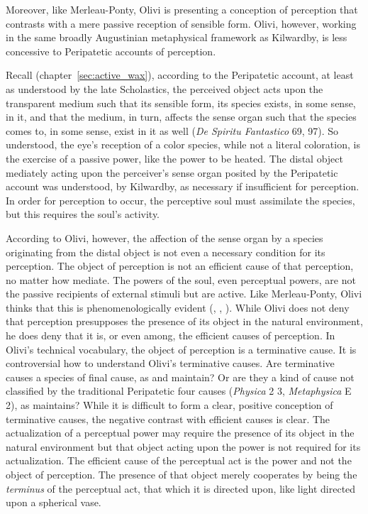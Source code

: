 Moreover, like Merleau-Ponty, Olivi is presenting a conception of perception that contrasts with a mere passive reception of sensible form. Olivi, however, working in the same broadly Augustinian metaphysical framework as Kilwardby, is less concessive to Peripatetic accounts of perception. 

Recall (chapter~\ref{sec:active_wax}), according to the Peripatetic account, at least as understood by the late Scholastics, the perceived object acts upon the transparent medium such that its sensible form, its species exists, in some sense, in it, and that the medium, in turn, affects the sense organ such that the species comes to, in some sense, exist in it as well (\emph{De Spiritu Fantastico} 69, 97). So understood, the eye's reception of a color species, while not a literal coloration, is the exercise of a passive power, like the power to be heated. The distal object mediately acting upon the perceiver's sense organ posited by the Peripatetic account was understood, by Kilwardby, as necessary if insufficient for perception. In order for perception to occur, the perceptive soul must assimilate the species, but this requires the soul's activity. 

According to Olivi, however, the affection of the sense organ by a species originating from the distal object is not even a necessary condition for its perception. The object of perception is not an efficient cause of that perception, no matter how mediate. The powers of the soul, even perceptual powers, are not the passive recipients of external stimuli but are active. Like Merleau-Ponty, Olivi thinks that this is phenomenologically evident (\citealt[3--26, 39---54]{Tachau:1988aa}, \citealt[236--47]{Pasnau:1997aa}, \citealt[143]{Toivanen:2013ul}). While Olivi does not deny that perception presupposes the presence of its object in the natural environment, he does deny that it is, or even among, the efficient causes of perception. In Olivi's technical vocabulary, the object of perception is a terminative cause. It is controversial how to understand Olivi's terminative causes. Are terminative causes a species of final cause, as \citet[192--195]{Kent:1984zm} and \citet{Pasnau:1999kn} maintain? Or are they a kind of cause not classified by the traditional Peripatetic four causes (\emph{Physica} 2 3, \emph{Metaphysica} E 2), as \citet[chapter 6]{Toivanen:2013ul} maintains? While it is difficult to form a clear, positive conception of terminative causes, the negative contrast with efficient causes is clear. The actualization of a perceptual power may require the presence of its object in the natural environment but that object acting upon the power is not required for its actualization. The efficient cause of the perceptual act is the power and not the object of perception. The presence of that object merely cooperates by being the \emph{terminus} of the perceptual act, that which it is directed upon, like light directed upon a spherical vase.

